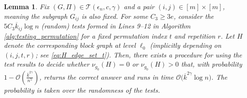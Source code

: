 \documentclass[journal]{IEEEtran}
\newtheorem{lemma}{Lemma}
\theoremstyle{definition}
\theoremstyle{definition}
\newcommand{\Tc}{\mathcal{T}}
\newcommand{\PV}{\nu}
\newcommand{\kb}{\overline{k}}
\newcommand{\bigO}{\mathcal{O}}
\begin{document}

\begin{lemma}
\label{lem:find_permutation_base}
Fix \((G,\Pi)\in \Tc(\epsilon_n,c,\gamma)\) and a pair \((i,j)\in[m]\times[m]\), meaning the subgraph  \(G_{ij}\) is also fixed.  For some $C_3 \ge 3e$, consider the $5C_3\kb_{ij} \log n$ (random) tests formed in Lines 9--12 in Algorithm \ref{alg:testing_permutation} for a fixed permutation index $t$ and repetition $r$.  Let $H$ denote the corresponding block graph at level $\ell_0$ (implicitly depending on $(i,j,t,r)$; see \eqref{eq:H_edge_set_t}).  Then, there exists a procedure for using the test results to decide whether \(\PV_{g_0}(H)=0\) or \(\PV_{g_0}(H) > 0\) that, with probability \(1 - \bigO \left(\frac{\kb^{2\gamma}}{n^{5}}\right)\), returns the correct answer and runs in time \(\bigO \big(\kb^{2\gamma}\log n\big)\).  The probability is taken over the randomness of the tests.
\end{lemma}
\end{document}
